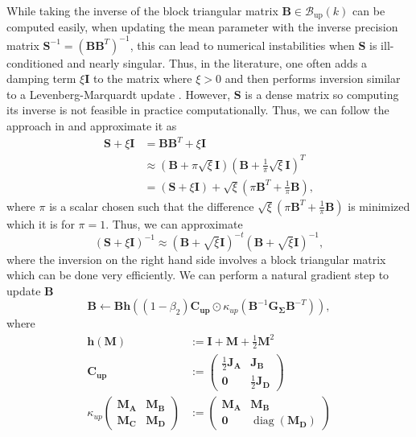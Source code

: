 \documentclass[a4paper, 11pt, oneside]{scrartcl}
\theoremstyle{break}
\DeclareMathOperator{\diag}{diag}
\newcommand{\matr}[1]{\boldsymbol{#1}}
\newcommand{\set}[1]{\mathcal{#1}}
\numberwithin{equation}{section}
\begin{document}
				While taking the inverse of the block triangular matrix $\matr{B} \in \set{B}_{\text{up}}(k)$ can be computed easily, when updating the mean parameter with the inverse precision matrix $\matr{S}^{-1} = (\matr{B} \matr{B}^T)^{-1}$, this can lead to numerical instabilities when $\matr{S}$ is ill-conditioned and nearly singular. 
				Thus, in the literature, one often adds a damping term $\xi \matr{I}$ to the matrix where $\xi > 0$ and then performs inversion similar to a Levenberg-Marquardt update \parencite{L44, M63}.
				However, $\matr{S}$ is a dense matrix so computing its inverse is not feasible in practice computationally.
				Thus, we can follow the approach in \parencite[Sec. 6.3]{MG15} and approximate it as 
				\begin{align*}
					\matr{S} + \xi \matr{I} &= \matr{B} \matr{B}^T + \xi \matr{I} \\
					&\approx (\matr{B} + \pi \sqrt{\xi} \matr{I}) (\matr{B} + \frac{1}{\pi} \sqrt{\xi} \matr{I})^T \\
					&= (\matr{S} + \xi \matr{I}) + \sqrt{\xi} \left(\pi \matr{B}^T + \frac{1}{\pi} \matr{B} \right),
				\end{align*}
				where $\pi$ is a scalar chosen such that the difference $\sqrt{\xi}(\pi \matr{B}^T + \frac{1}{\pi} \matr{B})$ is minimized which it is for $\pi = 1$.
				Thus, we can approximate
				\begin{equation*}
					(\matr{S} + \xi \matr{I})^{-1} \approx (\matr{B} + \sqrt{\xi} \matr{I})^{-t} (\matr{B} + \sqrt{\xi} \matr{I})^{-1},
				\end{equation*}
				where the inversion on the right hand side involves a block triangular matrix which can be done very efficiently. 
				We can perform a natural gradient step to update $\matr{B}$
				\begin{equation}
					\matr{B} \leftarrow \matr{B} \matr{h}((1 - \beta_2) \matr{C_{up}} \odot \kappa_{up}(\matr{B}^{-1} \matr{G_{\Sigma}} \matr{B}^{-T})),
				\end{equation}
				where
				\begin{align}
					\matr{h}(\matr{M}) &:= \matr{I} + \matr{M} + \frac{1}{2} \matr{M}^2 \label{eqn:h_func} \\
					\matr{C_{up}} &:= \begin{pmatrix} \frac{1}{2} \matr{J_A} & \matr{J_B} \\ \matr{0} & \frac{1}{2} \matr{J_D} \end{pmatrix} \label{eqn:C_up} \\
					\kappa_{up} \begin{pmatrix} \matr{M_A} & \matr{M_B} \\ \matr{M_C} & \matr{M_D} \end{pmatrix} &:= \begin{pmatrix} \matr{M_A} & \matr{M_B} \\ \matr{0} & \diag(\matr{M_D}) \end{pmatrix}
					\label{eqn:kappa_up}
				\end{align}
\end{document}

